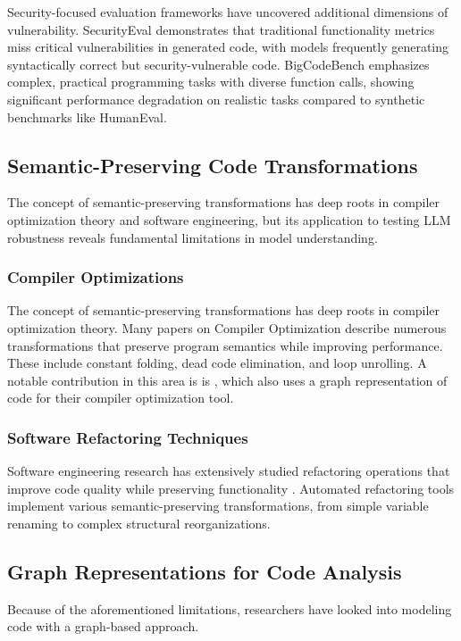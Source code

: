 \documentclass[%
thesis=student,%
coverpage=false,%
titlepage=false,%
headmarks=true, %
english,%
font=libertine, %
math=newpxtx, %
BCOR=5mm,%
coverBCOR=11mm%
]{tum-templates/book/tumbook}
\begin{document}
Security-focused evaluation frameworks have uncovered additional dimensions of vulnerability. SecurityEval \cite{siddiq2022seceval} demonstrates that traditional functionality metrics miss critical vulnerabilities in generated code, with models frequently generating syntactically correct but security-vulnerable code. BigCodeBench \cite{Zhuo2025} emphasizes complex, practical programming tasks with diverse function calls, showing significant performance degradation on realistic tasks compared to synthetic benchmarks like HumanEval.

\subsection{Semantic-Preserving Code Transformations}

The concept of semantic-preserving transformations has deep roots in compiler optimization theory and software engineering, but its application to testing LLM robustness reveals fundamental limitations in model understanding.

\subsubsection{Compiler Optimizations}
The concept of semantic-preserving transformations has deep roots in compiler optimization theory. Many papers on Compiler Optimization describe numerous transformations that preserve program semantics while improving performance. These include constant folding, dead code elimination, and loop unrolling. A notable contribution in this area is is \cite{Buchwald2011}, which also uses a graph representation of code for their compiler optimization tool.
\subsubsection{Software Refactoring Techniques}
Software engineering research has extensively studied refactoring operations that improve code quality while preserving functionality \cite{Fowler2002}. Automated refactoring tools implement various semantic-preserving transformations, from simple variable renaming to complex structural reorganizations.


\subsection{Graph Representations for Code Analysis}
Because of the aforementioned limitations, researchers have looked into modeling code with a graph-based approach. 
\end{document}
